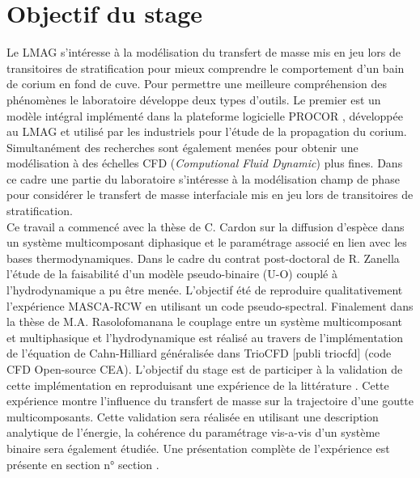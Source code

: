 \section{Objectif du stage}
Le LMAG s'intéresse à la modélisation du transfert de masse mis en jeu lors de transitoires de stratification pour mieux comprendre le comportement d'un bain de corium en fond de cuve. Pour permettre une meilleure compréhension des phénomènes le laboratoire développe deux types d'outils. Le premier est un modèle intégral implémenté dans la plateforme logicielle PROCOR \cite{le_tellier_phenomenological_2015}, développée au LMAG et utilisé par les industriels pour l’étude de la propagation du corium. Simultanément des recherches sont également menées pour obtenir une modélisation à des échelles CFD (\textit{Computional Fluid Dynamic}) plus fines. Dans ce cadre une partie du laboratoire s'intéresse à la modélisation champ de phase pour considérer le transfert de masse interfaciale mis en jeu lors de transitoires de stratification.\\ Ce travail a commencé avec la thèse de C. Cardon \cite{cardon_modelisation_2016} sur la diffusion d'espèce dans un système multicomposant diphasique et le paramétrage associé en lien avec les bases thermodynamiques. Dans le cadre du contrat post-doctoral de R. Zanella l'étude de la faisabilité d'un modèle pseudo-binaire (U-O) couplé à l'hydrodynamique a pu être menée. L'objectif été de reproduire qualitativement l'expérience MASCA-RCW \cites{zanella_two-_2020}{zanella_three-dimensional_2021} en utilisant un code pseudo-spectral. Finalement dans la thèse de M.A. Rasolofomanana \cite{rasolofomanana_modelisation_nodate} le couplage entre un système multicomposant et multiphasique et l'hydrodynamique est réalisé au travers de l'implémentation de l'équation de Cahn-Hilliard généralisée dans TrioCFD \color{red} [publi triocfd] \color{black} (code CFD Open-source CEA). L'objectif du stage est de participer à la validation de cette implémentation en reproduisant une expérience de la littérature \cite{rao_influence_2015}. Cette expérience montre l'influence du transfert de masse sur la trajectoire d'une goutte multicomposants. Cette validation sera réalisée en utilisant une description analytique de l'énergie, la cohérence du paramétrage vis-a-vis d'un système binaire sera également étudiée. Une présentation complète de l'expérience est présente en section \color{red} n° section \color{black}.

